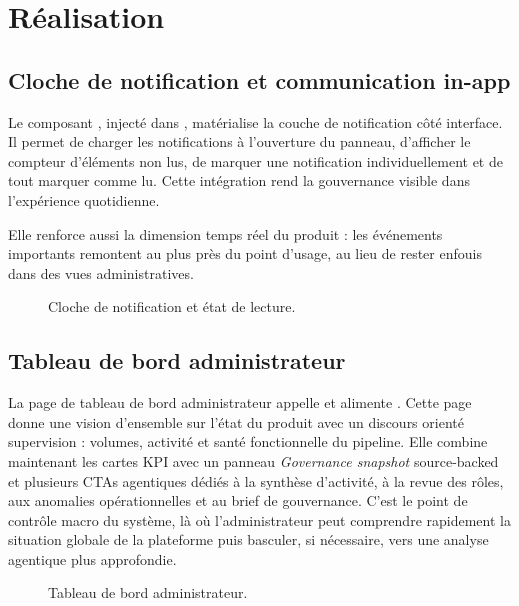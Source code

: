 \section{Réalisation}

\subsection{Cloche de notification et communication in-app}
Le composant , injecté dans , matérialise la couche de notification côté interface. Il permet de charger les notifications à l'ouverture du panneau, d'afficher le compteur d'éléments non lus, de marquer une notification individuellement et de tout marquer comme lu. Cette intégration rend la gouvernance visible dans l'expérience quotidienne.

Elle renforce aussi la dimension temps réel du produit : les événements importants remontent au plus près du point d'usage, au lieu de rester enfouis dans des vues administratives.

\begin{figure}[H]
  \centering
  \caption{Cloche de notification et état de lecture.}
\end{figure}

\subsection{Tableau de bord administrateur}
La page de tableau de bord administrateur appelle  et alimente . Cette page donne une vision d'ensemble sur l'état du produit avec un discours orienté supervision : volumes, activité et santé fonctionnelle du pipeline.
Elle combine maintenant les cartes KPI avec un panneau \textit{Governance snapshot} source-backed et plusieurs CTAs agentiques dédiés à la synthèse d'activité, à la revue des rôles, aux anomalies opérationnelles et au brief de gouvernance.
C'est le point de contrôle macro du système, là où l'administrateur peut comprendre rapidement la situation globale de la plateforme puis basculer, si nécessaire, vers une analyse agentique plus approfondie.

\begin{figure}[H]
  \centering
  \caption{Tableau de bord administrateur.}
\end{figure}

